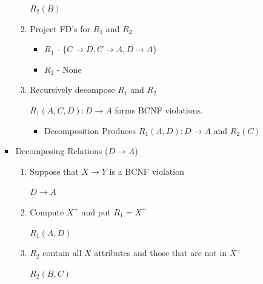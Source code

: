 \documentclass[12pt]{article}
\begin{document}
\begin{enumerate}[1.]
\begin{enumerate}[a)]
\begin{itemize}
\begin{enumerate}[1.]
                \color{red}
                $R_2(B)$
                \color{black}

                \item Project FD's for $R_1$ and $R_2$

                \bigskip

                \begin{itemize}
                    \item $R_1$ - \color{red}$\{C \to D, C \to A, D \to A \}$\color{black}
                    \item $R_2$ - \color{red}None\color{black}

                \end{itemize}
                \item Recursively decompose $R_1$ and $R_2$

                \bigskip

                \color{red}$R_1(A,C,D):D \to A$ forms BCNF violations.\color{black}

                \bigskip

                \begin{itemize}
                    \item \color{red}Decomposition Produces $R_1 (A,D): D \to A$ and $R_2 (C)$\color{black}
                \end{itemize}


            \end{enumerate}

            \item Decomposing Relations ($D \to A$)

            \begin{enumerate}[1.]
                \item Suppose that $X \to Y$ is a BCNF violation

                \color{red}
                $D \to A$
                \color{black}

                \item Compute $X^+$ and put $R_1 = X^+$

                \color{red}
                $R_1(A,D)$
                \color{black}

                \item $R_2$ contain all $X$ attributes and those that are not in $X^+$

                \color{red}
                $R_2(B,C)$
                \color{black}


\end{enumerate}
\end{itemize}
\end{enumerate}
\end{enumerate}
\end{document}
